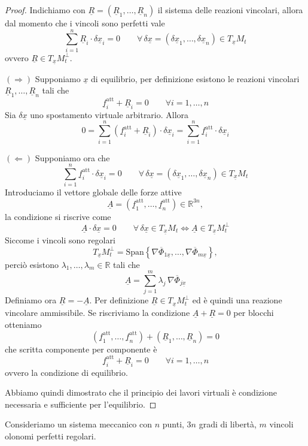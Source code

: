 \begin{proof}
Indichiamo con \(\underline{R}=(\underline{R}_1,\ldots,\underline{R}_n)\) il sistema delle reazioni vincolari, allora dal momento che i vincoli sono perfetti vale
\[
\sum_{i=1}^{n}\underline{R}_i\cdot \delta \underline{x}_i=0
\qquad
\forall\, \delta \underline{x}=(\delta \underline{x}_1,\ldots,\delta \underline{x}_n)\in T_{\underline{x}}M_t
\]
ovvero \(\underline{R}\in T_{\underline{x}}M_t^\perp\).

\((\Rightarrow)\) Supponiamo \(\underline{x}\) di equilibrio, per definizione esistono le reazioni vincolari \(\underline{R}_1,\ldots,\underline{R}_n\) tali che
\[
\underline{f}_i^{\mathrm{att}}+\underline{R}_i=0
\qquad
\forall i=1,\ldots,n
\]
Sia \(\delta \underline{x}\) uno spostamento virtuale arbitrario. Allora
\[
0=\sum_{i=1}^{n}\left(\underline{f}_i^{\mathrm{att}}+\underline{R}_i\right)\cdot \delta \underline{x}_i
=\sum_{i=1}^{n}\underline{f}_i^{\mathrm{att}}\cdot \delta \underline{x}_i
\]

\((\Leftarrow)\) Supponiamo ora che
\[
\sum_{i=1}^{n}\underline{f}_i^{\mathrm{att}}\cdot \delta \underline{x}_i=0
\qquad
\forall\, \delta \underline{x}=(\delta \underline{x}_1,\ldots,\delta \underline{x}_n)\in T_{\underline{x}}M_t
\]
Introduciamo il vettore globale delle forze attive
\[
\underline{A}=(\underline{f}_1^{\mathrm{att}},\ldots,\underline{f}_n^{\mathrm{att}})\in\mathbb{R}^{3n},
\]
la condizione si riscrive come
\[
\underline{A}\cdot \delta \underline{x}=0
\qquad
\forall\, \delta \underline{x}\in T_{\underline{x}}M_t
\Longleftrightarrow
\underline{A}\in T_{\underline{x}}M_t^\perp
\]
Siccome i vincoli sono regolari
\[
T_{\underline{x}}M_t^\perp=\mathrm{Span}\left\{\nabla \overline{\Phi}_{1\underline{x}},\ldots,\nabla \overline{\Phi}_{m\underline{x}}\right\},
\]
perciò esistono $\lambda_1, \dots, \lambda_m \in \mathbb{R}$ tali che
\[
\underline{A}=\sum_{j=1}^{m}\lambda_j\,\nabla \overline{\Phi}_{j\underline{x}}
\]
Definiamo ora \(\underline{R}=-\underline{A}\). Per definizione \(\underline{R}\in T_{\underline{x}}M_t^\perp\) ed è quindi una reazione vincolare ammissibile. Se riscriviamo la condizione \(\underline{A}+\underline{R}=0\) per blocchi otteniamo
\[
(\underline{f}_1^{\mathrm{att}},\ldots,\underline{f}_n^{\mathrm{att}})+(\underline{R}_1,\ldots,\underline{R}_n)=0
\]
che scritta componente per componente è
\[
\underline{f}_i^{\mathrm{att}}+\underline{R}_i=0
\qquad
\forall i=1,\ldots,n
\]
ovvero la condizione di equilibrio.

Abbiamo quindi dimostrato che il principio dei lavori virtuali è condizione necessaria e sufficiente per l'equilibrio.
\end{proof}
\fineapprof
Consideriamo un sistema meccanico con \(n\) punti, \(3n\) gradi di libertà, \(m\) vincoli olonomi perfetti regolari.

